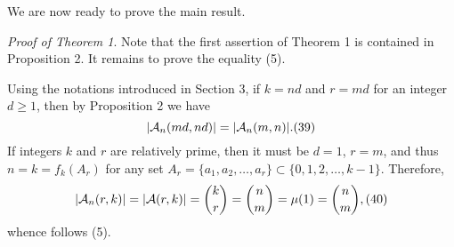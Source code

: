 \documentclass[12pt]{amsart}
\begin{document}
{We are now ready to prove the main result.

\vspace{2mm}

{\it Proof of Theorem 1}. Note that the first assertion 
of Theorem 1 is contained in Proposition 2. 
It remains to prove the equality (5).

Using the notations introduced in Section 3, if 
$k=nd$ and $r=md$ for an integer $d\ge 1$,  then by Proposition 2 we have 
     $$
|{\mathcal A}_n(md,nd)|=|{\mathcal A}_n(m,n)|.\relax(39)
     $$
If  integers $k$ and $r$ are relatively prime, 
then it must be $d=1$, $r=m$, and thus $n=k=f_k(A_r)$ for any set 
$A_r=\{a_1,a_2,\ldots,a_r\}\subset \{0,1,2,\ldots,k-1\}$. Therefore,  
$$
\left|{\mathcal A}_n(r,k)\right|
=\left|{\mathcal A}(r,k)\right|={k\choose r}={n\choose m}=\mu(1)=
{n\choose m},\relax(40)
 $$
whence follows (5). 

}
\end{document}
